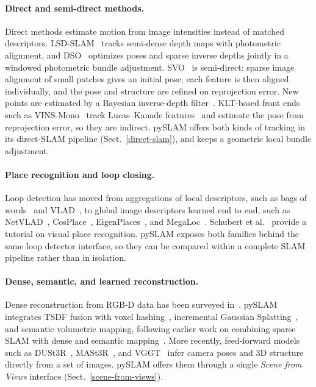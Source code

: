 \documentclass{article}
\let\oldparagraph\paragraph
\renewcommand{\paragraph}[1]{\oldparagraph{#1}\mbox{}}
\begin{document}
\paragraph{Direct and semi-direct methods.}
Direct methods estimate motion from image intensities instead of matched descriptors. LSD-SLAM~\cite{engel2014lsd} tracks semi-dense depth maps with photometric alignment, and DSO~\cite{engel2018dso} optimizes poses and sparse inverse depths jointly in a windowed photometric bundle adjustment. SVO~\cite{forster2014svo,forster2017svo} is semi-direct: sparse image alignment of small patches gives an initial pose, each feature is then aligned individually, and the pose and structure are refined on reprojection error. New points are estimated by a Bayesian inverse-depth filter~\cite{vogiatzis2011video}. KLT-based front ends such as VINS-Mono~\cite{qin2018vins} track Lucas--Kanade features~\cite{lucas1981iterative} and estimate the pose from reprojection error, so they are indirect. pySLAM offers both kinds of tracking in its direct-SLAM pipeline (Sect.~\ref{direct-slam}), and keeps a geometric local bundle adjustment.

\paragraph{Place recognition and loop closing.}
Loop detection has moved from aggregations of local descriptors, such as bags of words~\cite{galvez2012bags} and VLAD~\cite{jegou2010aggregating}, to global image descriptors learned end to end, such as NetVLAD~\cite{arandjelovic2016netvlad}, CosPlace~\cite{berton2023cosplace}, EigenPlaces~\cite{berton2023eigenplaces}, and MegaLoc~\cite{berton2025megaloc}. Schubert et al.~\cite{schubert2023visual} provide a tutorial on visual place recognition. pySLAM exposes both families behind the same loop detector interface, so they can be compared within a complete SLAM pipeline rather than in isolation.

\paragraph{Dense, semantic, and learned reconstruction.}
Dense reconstruction from RGB-D data has been surveyed in~\cite{zollhofer2018state}. pySLAM integrates TSDF fusion with voxel hashing~\cite{dong2022ash}, incremental Gaussian Splatting~\cite{matsuki2023gaussian,kerbl20233d}, and semantic volumetric mapping, following earlier work on combining sparse SLAM with dense and semantic mapping~\cite{freda2023plvs,pyslamSemantic2025}. More recently, feed-forward models such as DUSt3R~\cite{wang2023dust3r}, MASt3R~\cite{leroy2024grounding}, and VGGT~\cite{wang2025vggt} infer camera poses and 3D structure directly from a set of images. pySLAM offers them through a single \textit{Scene from Views} interface (Sect.~\ref{scene-from-views}).
\end{document}
